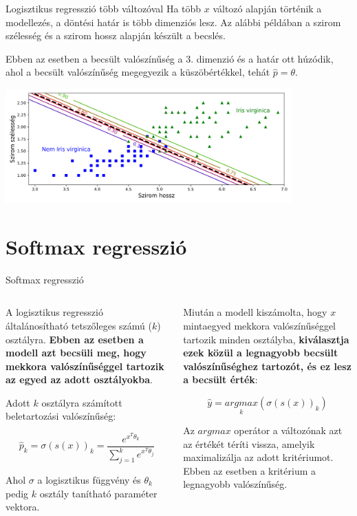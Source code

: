 \documentclass[english, aspectratio=169]{beamer}
\makeatletter
\let\origtableofcontents=\tableofcontents
\def\tableofcontents{\@ifnextchar[{\origtableofcontents}{\gobbletableofcontents}}
\def\gobbletableofcontents#1{\origtableofcontents}
\makeatother
\begin{document}
\begin{frame}{Logisztikus regresszió több változóval}
Ha több $x$ változó alapján történik a modellezés, a döntési határ is több dimenziós lesz. Az alábbi példában a szirom szélesség és a szirom hossz alapján készült a becslés.\par\smallskip
Ebben az esetben a becsült valószínűség a 3. dimenzió és a határ ott húzódik, ahol a becsült valószínűség megegyezik a küszöbértékkel, tehát $\hat{p} = \theta$.
\begin{center}
\includegraphics[width=11cm, keepaspectratio]{images/osztalyozas_21.png}
\end{center} 
\end{frame}

\section{Softmax regresszió}

\begin{frame}
\tableofcontents[currentsection]
\end{frame}

\begin{frame}{Softmax regresszió}
\begin{columns}
\begin{column}{.5\textwidth}
A logisztikus regresszió általánosítható tetszőleges számú ($k$) osztályra. \textbf{Ebben az esetben a modell azt becsüli meg, hogy mekkora valószínűséggel tartozik az egyed az adott osztályokba}.\par\smallskip
Adott $k$ osztályra számított beletartozási valószínűség: 
\begin{block}{}
\[
\hat{p}_k = \sigma \left( s \left( x \right) \right)_k = \frac{e^{x^T \theta_k}}{\sum_{j=1}^k e^{x^T \theta_j}}
\]
\end{block}
Ahol $\sigma$ a logisztikus függvény és $\theta_k$ pedig $k$ osztály tanítható paraméter vektora. 
\end{column}
\begin{column}{.5\textwidth}
Miután a modell kiszámolta, hogy $x$ mintaegyed mekkora valószínűséggel tartozik minden osztályba, \textbf{kiválasztja ezek közül a legnagyobb becsült valószínűséghez tartozót, és ez lesz a becsült érték}:
\begin{block}{}
\[
\hat{y} = \underset{k}{argmax}\left( \sigma \left( s \left( x \right) \right)_k \right)
\]
\end{block}
Az $argmax$ operátor a változónak azt az értékét téríti vissza, amelyik maximalizálja az adott kritériumot. Ebben az esetben a kritérium a legnagyobb valószínűség.
\end{column}
\end{columns}
\end{frame}
\end{document}
